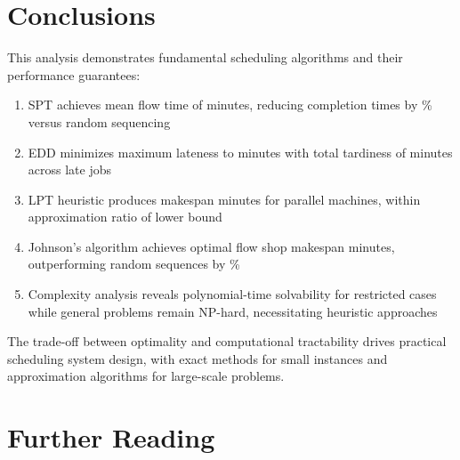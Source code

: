 \documentclass[a4paper, 11pt]{article}
\begin{document}
\section{Conclusions}

This analysis demonstrates fundamental scheduling algorithms and their performance guarantees:
\begin{enumerate}
\item SPT achieves mean flow time of  minutes, reducing completion
times by \%
versus random sequencing
\item EDD minimizes maximum lateness to  minutes with total tardiness
of  minutes across  late jobs
\item LPT heuristic produces makespan  minutes for parallel machines,
within approximation ratio  of lower bound
\item Johnson's algorithm achieves optimal flow shop makespan  minutes,
outperforming random sequences by \%
\item Complexity analysis reveals polynomial-time solvability for restricted cases while general
problems remain NP-hard, necessitating heuristic approaches
\end{enumerate}

The trade-off between optimality and computational tractability drives practical scheduling system
design, with exact methods for small instances and approximation algorithms for large-scale problems.

\section*{Further Reading}
\end{document}
